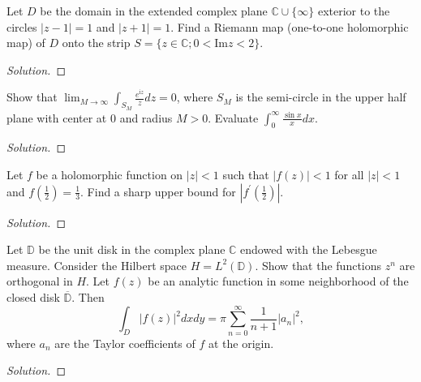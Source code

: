 \documentclass[10pt]{article}
\newenvironment{soln}{\begin{proof}[Solution]}{\end{proof}}
\begin{document}
\begin{problem}
[2000 A-I-1]
Let $D$ be the domain in the extended complex plane $\mathbb{C} \cup\{\infty\}$ exterior to the circles $|z-1|=1$ and $|z+1|=1$. Find a Riemann map (one-to-one holomorphic map) of $D$ onto the strip $S=\{z \in \mathbb{C} ; 0<\text{Im} z<2\}$.
\end{problem}

\begin{soln}

\end{soln}



\begin{problem}
[2000 A-I-6]
Show that $\lim _{M \rightarrow \infty} \int_{S_M} \frac{e^{\mathrm{i} z}}{z} d z=0$, where $S_M$ is the semi-circle in the upper half plane with center at 0 and radius $M>0$. Evaluate $\int_0^{\infty} \frac{\sin x}{x} d x$.
\end{problem}

\begin{soln}

\end{soln}



\begin{problem}
[2000 A-II-1]
Let $f$ be a holomorphic function on $|z|<1$ such that $|f(z)|<1$ for all $|z|<1$ and $f\left(\frac{1}{2}\right)=\frac{1}{3}$. Find a sharp upper bound for $\left|f^{\prime}\left(\frac{1}{2}\right)\right|$.
\end{problem}

\begin{soln}

\end{soln}



\begin{problem}
[2000 A-II-5]
Let $\mathbb{D}$ be the unit disk in the complex plane $\mathbb{C}$ endowed with the Lebesgue measure. Consider the Hilbert space $H=L^2(\mathbb{D})$. Show that the functions $z^n$ are orthogonal in $H$. Let $f(z)$ be an analytic function in some neighborhood of the closed disk $\overline{\mathbb{D}}$. Then
$$
\int_D|f(z)|^2 d x d y=\pi \sum_{n=0}^{\infty} \frac{1}{n+1}\left|a_n\right|^2,
$$
where $a_n$ are the Taylor coefficients of $f$ at the origin.
\end{problem}

\begin{soln}

\end{soln}
\end{document}
